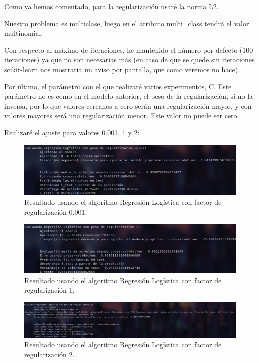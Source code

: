 \documentclass[12pt, spanish]{article}
\begin{document}
Como ya hemos comentado, para la regularización usaré la norma L2.

Nuestro problema es multiclase, luego en el atributo multi\_class tendrá el valor multinomial.

Con respecto al máximo de iteraciones, he mantenido el número por defecto (100 iteraciones) ya que no son necesarias más (en caso de que se quede sin iteraciones scikit-learn nos mostraría un aviso por pantalla, que como veremos no hace).

Por último, el parámetro con el que realizaré varios experimentos, C. Este parámetro no es como en el modelo anterior, el peso de la regularización, si no la inversa, por lo que valores cercanos a cero serán una regularización mayor, y con valores mayores será una regularización menor. Este valor no puede ser cero.

Realizaré el ajuste para valores 0.001, 1 y 2:

\begin{figure}[H]
	\centering
	\includegraphics[scale=0.45]{clasificacion/logistic0001.png}
	\caption{Resultado usando el algoritmo Regresión Logística con factor de regularización 0.001.}
	\label{LR001}
\end{figure}


\begin{figure}[H]
	\centering
	\includegraphics[scale=0.45]{clasificacion/logistic1.png}
	\caption{Resultado usando el algoritmo Regresión Logística con factor de regularización 1.}
	\label{LR1}
\end{figure}

\begin{figure}[H]
	\centering
	\hspace*{-1cm}\includegraphics[scale=0.3]{clasificacion/logistic2.png}
	\caption{Resultado usando el algoritmo Regresión Logística con factor de regularización 2.}
	\label{LR2}
\end{figure}
\end{document}
